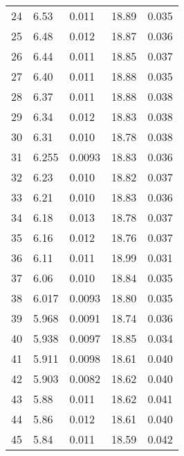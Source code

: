 \begin{table}
\begin{tabular}{c|ll|ll}
24 & 6.53 & 0.011 & 18.89 & 0.035 \\
25 & 6.48 & 0.012 & 18.87 & 0.036 \\
26 & 6.44 & 0.011 & 18.85 & 0.037 \\
27 & 6.40 & 0.011 & 18.88 & 0.035 \\
28 & 6.37 & 0.011 & 18.88 & 0.038 \\
29 & 6.34 & 0.012 & 18.83 & 0.038 \\
30 & 6.31 & 0.010 & 18.78 & 0.038 \\
31 & 6.255 & 0.0093 & 18.83 & 0.036 \\
32 & 6.23 & 0.010 & 18.82 & 0.037 \\
33 & 6.21 & 0.010 & 18.83 & 0.036 \\
34 & 6.18 & 0.013 & 18.78 & 0.037 \\
35 & 6.16 & 0.012 & 18.76 & 0.037 \\
36 & 6.11 & 0.011 & 18.99 & 0.031 \\
37 & 6.06 & 0.010 & 18.84 & 0.035 \\
38 & 6.017 & 0.0093 & 18.80 & 0.035 \\
39 & 5.968 & 0.0091 & 18.74 & 0.036 \\
40 & 5.938 & 0.0097 & 18.85 & 0.034 \\
41 & 5.911 & 0.0098 & 18.61 & 0.040 \\
42 & 5.903 & 0.0082 & 18.62 & 0.040 \\
43 & 5.88 & 0.011 & 18.62 & 0.041 \\
44 & 5.86 & 0.012 & 18.61 & 0.040 \\
45 & 5.84 & 0.011 & 18.59 & 0.042 \\
               \hline
        \end{tabular}
    \end{table}
    \clearpage

